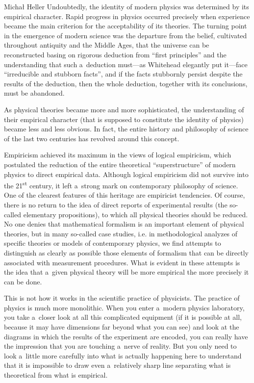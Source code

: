 \begin{editorialeng}{Michał Heller}
Undoubtedly, the identity of modern physics was determined by its empirical character. Rapid progress in physics occurred precisely when experience became the main criterion for the acceptability of its theories. The turning point in the emergence of modern science was the departure from the belief, cultivated throughout antiquity and the Middle Ages, that the universe can be reconstructed basing on rigorous deduction from ``first principles'' and the understanding that such a~deduction must---as Whitehead elegantly put it---face ``irreducible and stubborn facts'', and if the facts stubbornly persist despite the results of the deduction, then the whole deduction, together with its conclusions, must be abandoned.

As physical theories became more and more sophisticated, the understanding of their empirical character (that is supposed to constitute the identity of physics) became less and less obvious. In fact, the entire history and philosophy of science of the last two centuries has revolved around this concept.

Empiricism achieved its maximum in the views of logical empiricism, which postulated the reduction of the entire theoretical ``superstructure'' of modern physics to direct empirical data. Although logical empiricism did not survive into the 21\textsuperscript{st} century, it left a~strong mark on contemporary philosophy of science. One of the clearest features of this heritage are empiricist tendencies. Of course, there is no return to the idea of direct reports of experimental results (the so-called elementary propositions), to which all physical theories should be reduced. No one denies that mathematical formalism is an important element of physical theories, but in many so-called case studies, i.e. in methodological analyzes of specific theories or models of contemporary physics, we find attempts to distinguish as clearly as possible those elements of formalism that can be directly associated with measurement procedures. What is evident in these attempts is the idea that a~given physical theory will be more empirical the more precisely it can be done.

This is not how it works in the scientific practice of physicists. The practice of physics is much more monolithic. When you enter a~modern physics laboratory, you take a~closer look at all this complicated equipment (if it is possible at all, because it may have dimensions far beyond what you can see) and look at the diagrams in which the results of the experiment are encoded, you can really have the impression that you are touching a~nerve of reality. But you only need to look a~little more carefully into what is actually happening here to understand that it is impossible to draw even a~relatively sharp line separating what is theoretical from what is empirical.


\end{editorialeng}
